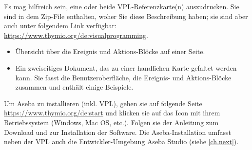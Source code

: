 
Es mag hilfreich sein, eine oder beide VPL-Referenzkarte(n) auszudrucken. Sie sind in dem Zip-File enthalten, woher Sie diese Beschreibung haben; sie sind aber auch unter folgendem Link verfügbar: \href{https://www.thymio.org/de:visualprogramming}{https://www.thymio.org/de:visualprogramming}.

\begin{itemize}
\item Übersicht über die Ereignis und Aktions-Blöcke auf einer Seite.
\item Ein zweiseitiges Dokument, das zu einer handlichen Karte gefaltet werden kann. Sie fasst die Benutzeroberfläche, die Ereignis- und Aktions-Blöcke zusammen und enthält einige Beispiele.
\end{itemize}


Um Aseba zu installieren (inkl. VPL), gehen sie auf folgende Seite 
\href{https://www.thymio.org/de:start}{https://www.thymio.org/de:start}
und klicken sie auf das Icon mit ihrem Betriebssystem (Windows, Mac OS, etc.). Folgen sie der Anleitung zum Download und zur Installation der Software. Die Aseba-Installation umfasst neben der VPL auch die Entwickler-Umgebung Aseba Studio (siehe \cref{ch.next}).
